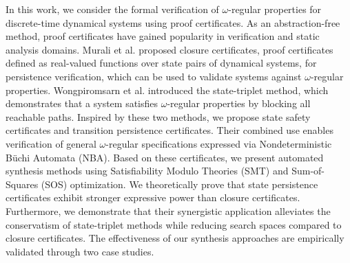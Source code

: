 \documentclass[acmlarge]{acmart}
\begin{document}
In this work, we consider the formal verification of $\omega$-regular properties for discrete-time dynamical systems using proof certificates. As an abstraction-free method, proof certificates have gained popularity in verification and static analysis domains\cite{chakarov2013probabilistic,chatterjee2016algorithmic,chatterjee2024sound,chatterjee2024equivalence}. Murali et al.\cite{murali2024closure} proposed closure certificates, proof certificates defined as real-valued functions over state pairs of dynamical systems, for persistence verification, which can be used to validate systems against $\omega$-regular properties. Wongpiromsarn et al.\cite{wongpiromsarn2015automata} introduced the state-triplet method, which demonstrates that a system satisfies $\omega$-regular properties by blocking all reachable paths. Inspired by these two methods, we propose state safety certificates and transition persistence certificates. Their combined use enables verification of general $\omega$-regular specifications expressed via Nondeterministic Büchi Automata (NBA)\cite{buchi1966symposium}. Based on these certificates, we present automated synthesis methods using Satisfiability Modulo Theories (SMT) and Sum-of-Squares (SOS) optimization. We theoretically prove that state persistence certificates exhibit stronger expressive power than closure certificates. Furthermore, we demonstrate that their synergistic application alleviates the conservatism of state-triplet methods while reducing search spaces compared to closure certificates. The effectiveness of our synthesis approaches are empirically validated through two case studies.
\end{document}

